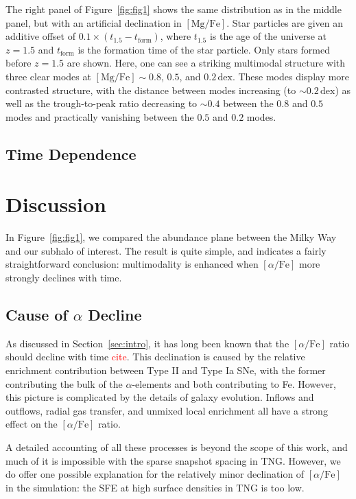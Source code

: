 \documentclass[linenumbers, twocolumn]{aastex631}
\newcommand{\MgFe}{\ensuremath{[\textrm{Mg}/\textrm{Fe}]}}
\newcommand{\alphaFe}{\ensuremath{[\alpha/\textrm{Fe}]}}
\newcommand{\dex}{\ensuremath{\textrm{dex}}}
\newcommand{\red}[1]{\textcolor{red}{#1}}
\begin{document}
The right panel of Figure~\ref{fig:fig1} shows the same distribution as in the middle panel, but with an artificial declination in \MgFe{}. Star particles are given an additive offset of $0.1\times\left(t_{1.5}-t_{\textrm{form}}\right)$, where $t_{1.5}$ is the age of the universe at $z=1.5$ and $t_{\textrm{form}}$ is the formation time of the star particle. Only stars formed before $z=1.5$ are shown. Here, one can see a striking multimodal structure with three clear modes at $\MgFe\sim0.8$, $0.5$, and $0.2\,\dex$. These modes display more contrasted structure, with the distance between modes increasing (to $\sim0.2\,\dex$) as well as the trough-to-peak ratio decreasing to $\sim0.4$ between the $0.8$ and $0.5$ modes and practically vanishing between the $0.5$ and $0.2$ modes.

\subsection{Time Dependence}\label{sec:timedep}

\section{Discussion}\label{sec:disc}
In Figure~\ref{fig:fig1}, we compared the abundance plane between the Milky Way and our subhalo of interest. The result is quite simple, and indicates a fairly straightforward conclusion: multimodality is enhanced when \alphaFe{} more strongly declines with time. 

\subsection{Cause of $\alpha$ Decline}\label{ssec:sfe}
As discussed in Section~\ref{sec:intro}, it has long been known that the \alphaFe{} ratio should decline with time \red{cite}. This declination is caused by the relative enrichment contribution between Type II and Type Ia SNe, with the former contributing the bulk of the $\alpha$-elements and both contributing to Fe. However, this picture is complicated by the details of galaxy evolution. Inflows and outflows, radial gas transfer, and unmixed local enrichment all have a strong effect on the \alphaFe{} ratio.

A detailed accounting of all these processes is beyond the scope of this work, and much of it is impossible with the sparse snapshot spacing in TNG. However, we do offer one possible explanation for the relatively minor declination of \alphaFe{} in the simulation: the SFE at high surface densities in TNG is too low.
\end{document}
